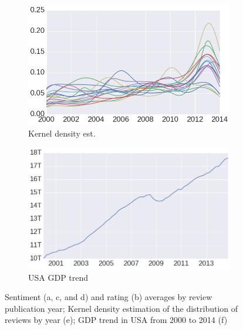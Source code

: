 \begin{figure}[ht!]
    \begin{subfigure}{.50\textwidth}
        \centering
        \includegraphics[width=\columnwidth]{ch05_musicology_pics/kde.png}
        \caption{Kernel density est.}
        \label{fig:musicology:kde}
    \end{subfigure}
    \begin{subfigure}{.48\textwidth}
        \centering
        \includegraphics[width=\linewidth]{ch05_musicology_pics/gdp2.png}
        \caption{USA GDP trend}
        \label{fig:musicology:gdp}
    \end{subfigure}
    
    \caption{Sentiment (a, c, and d) and rating (b) averages by review publication year; Kernel density estimation of the distribution of reviews by year (e); GDP trend in USA from 2000 to 2014 (f)}
\end{figure}



